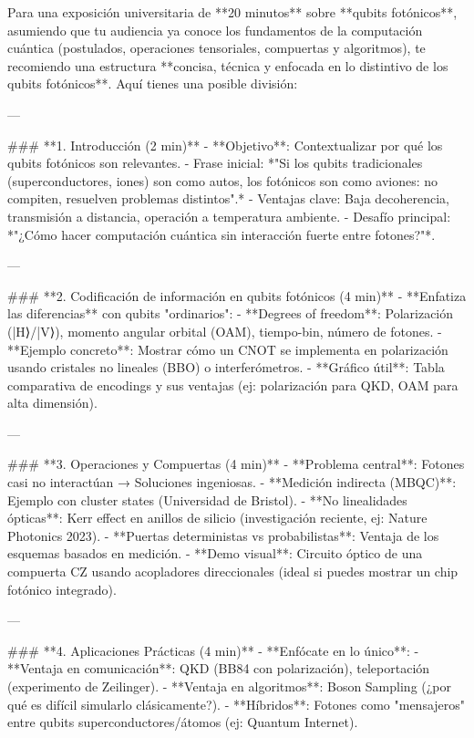 Para una exposición universitaria de **20 minutos** sobre **qubits fotónicos**, asumiendo que tu audiencia ya conoce los fundamentos de la computación cuántica (postulados, operaciones tensoriales, compuertas y algoritmos), te recomiendo una estructura **concisa, técnica y enfocada en lo distintivo de los qubits fotónicos**. Aquí tienes una posible división:

---

### **1. Introducción (2 min)**
- **Objetivo**: Contextualizar por qué los qubits fotónicos son relevantes.  
  - Frase inicial: *"Si los qubits tradicionales (superconductores, iones) son como autos, los fotónicos son como aviones: no compiten, resuelven problemas distintos".*  
  - Ventajas clave: Baja decoherencia, transmisión a distancia, operación a temperatura ambiente.  
  - Desafío principal: *"¿Cómo hacer computación cuántica sin interacción fuerte entre fotones?"*.

---

### **2. Codificación de información en qubits fotónicos (4 min)**
- **Enfatiza las diferencias** con qubits "ordinarios":  
  - **Degrees of freedom**: Polarización (|H⟩/|V⟩), momento angular orbital (OAM), tiempo-bin, número de fotones.  
  - **Ejemplo concreto**: Mostrar cómo un CNOT se implementa en polarización usando cristales no lineales (BBO) o interferómetros.  
  - **Gráfico útil**: Tabla comparativa de encodings y sus ventajas (ej: polarización para QKD, OAM para alta dimensión).  

---

### **3. Operaciones y Compuertas (4 min)**
- **Problema central**: Fotones casi no interactúan → Soluciones ingeniosas.  
  - **Medición indirecta (MBQC)**: Ejemplo con cluster states (Universidad de Bristol).  
  - **No linealidades ópticas**: Kerr effect en anillos de silicio (investigación reciente, ej: Nature Photonics 2023).  
  - **Puertas deterministas vs probabilistas**: Ventaja de los esquemas basados en medición.  
  - **Demo visual**: Circuito óptico de una compuerta CZ usando acopladores direccionales (ideal si puedes mostrar un chip fotónico integrado).  

---

### **4. Aplicaciones Prácticas (4 min)**
- **Enfócate en lo único**:  
  - **Ventaja en comunicación**: QKD (BB84 con polarización), teleportación (experimento de Zeilinger).  
  - **Ventaja en algoritmos**: Boson Sampling (¿por qué es difícil simularlo clásicamente?).  
  - **Híbridos**: Fotones como "mensajeros" entre qubits superconductores/átomos (ej: Quantum Internet).  

